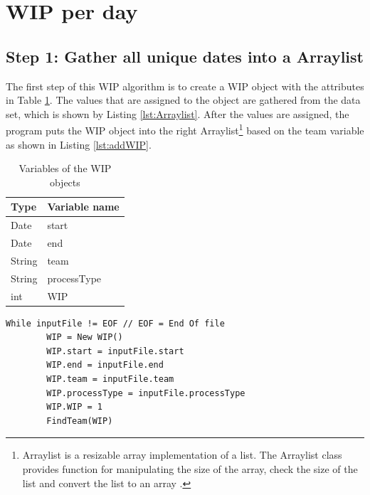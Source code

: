 \documentclass[UKenglish]{ifimaster}  %
\begin{document}
\section {WIP per day}
\label{WPD}


\subsection{Step 1: Gather all unique dates into a Arraylist}
\label{sub:stepOne}
The first step of this WIP algorithm is to create a WIP object with the attributes in Table \ref{tab:object}.  The values that are assigned to the object are gathered from the data set, which is shown by Listing \ref{lst:Arraylist}. After the values are assigned, the program puts the WIP object into the right Arraylist\footnote{Arraylist is a resizable array implementation of a list. The Arraylist class provides function for manipulating the size of the array, check the size of the list and convert the list to an array  \parencite{Arraylist}.} based on the team variable as shown in Listing \ref{lst:addWIP}. 
\begin{table}[!ht]
\begin{center}
\begin{tabular}{| l | l |}
\hline
\bf{Type} & \bf{Variable name} \\ \hline
Date & start \\ \hline
Date & end\\ \hline
String & team\\ \hline
String & processType\\ \hline
int  & WIP\\ \hline
\end{tabular}
\caption{Variables of the WIP objects}
\label{tab:object}
\end{center}
\end{table}


\begin{minipage}{\textwidth} 
 \begin{lstlisting}[caption={Gather all unique dates into Arraylist},label={lst:Arraylist}]
While inputFile != EOF // EOF = End Of file
		WIP = New WIP()
		WIP.start = inputFile.start
		WIP.end = inputFile.end
		WIP.team = inputFile.team
		WIP.processType = inputFile.processType
		WIP.WIP = 1
		FindTeam(WIP)
 \end{lstlisting}
 \end{minipage}
\end{document}
